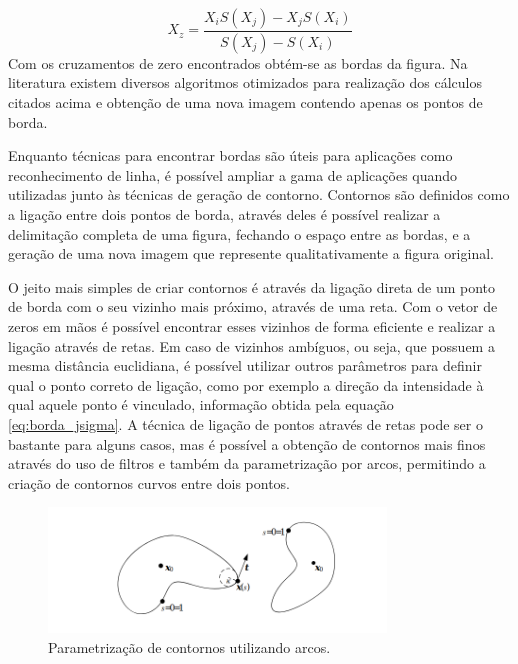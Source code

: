 \begin{equation}
    X_{z} = \frac{X_{i} S(X_{j}) - X_{j} S(X_{i}) }{ S(X_{j}) -  S(X_{i})}
    \label{eq:borda_xintercept}
\end{equation}
Com os cruzamentos de zero encontrados obtém-se as bordas da figura. Na literatura existem diversos algoritmos otimizados para realização dos cálculos citados acima e obtenção de uma nova imagem contendo apenas os pontos de borda.
\par
Enquanto técnicas para encontrar bordas são úteis para aplicações como reconhecimento de linha, é possível ampliar a gama de aplicações quando utilizadas junto às técnicas de geração de contorno. Contornos são definidos como a ligação entre dois pontos de borda, através deles é possível realizar a delimitação completa de uma figura, fechando o espaço entre as bordas, e a geração de uma nova imagem que represente qualitativamente a figura original. \cite{szeliski2021computer} 
\par
O jeito mais simples de criar contornos é através da ligação direta de um ponto de borda com o seu vizinho mais próximo, através de uma reta. Com o vetor de zeros em mãos é possível encontrar esses vizinhos de forma eficiente e realizar a ligação através de retas. Em caso de vizinhos ambíguos, ou seja, que possuem a mesma distância euclidiana, é possível utilizar outros parâmetros para definir qual o ponto correto de ligação, como por exemplo a direção da intensidade à qual aquele ponto é vinculado, informação obtida pela equação \ref{eq:borda_jsigma}. A técnica de ligação de pontos através de retas pode ser o bastante para alguns casos, mas é possível a obtenção de contornos mais finos através do uso de filtros e também da parametrização por arcos, permitindo a criação de contornos curvos entre dois pontos.
\begin{figure}[ht]
    \centering
    \includegraphics[width=0.8\textwidth]{capitulos/contornos_arcos.png}
    \caption{Parametrização de contornos utilizando arcos. \cite{szeliski2021computer}}
    \label{fig:contornos_arcos}
\end{figure}
